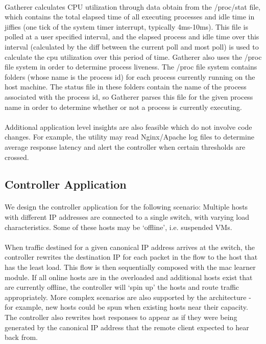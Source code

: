 \documentclass[10pt]{article}
\begin{document}
\paragraph{} Gatherer calculates CPU utilization through data obtain from the /proc/stat file, which contains the total elapsed time of all executing processes and idle time in jiffies (one tick of the system timer interrupt, typically 4ms-10ms). This file is polled at a user specified interval, and the elapsed process and idle time over this interval (calculated by the diff between the current poll and most poll) is used to calculate the cpu utilization over this period of time. Gatherer also uses the /proc file system in order to determine process liveness. The /proc file system contains folders (whose name is the process id) for each process currently running on the host machine. The status file in these folders contain the name of the process associated with the process id, so Gatherer parses this file for the given process name in order to determine whether or not a process is currently executing.

\paragraph{} Additional application level insights are also feasible which do not involve code changes. For example, the utility may read Nginx/Apache log files to determine average response latency and alert the controller when certain thresholds are crossed.

\subsection{Controller Application}

\paragraph{} We design the controller application for the following scenario: Multiple hosts with different IP addresses are connected to a single switch, with varying load characteristics. Some of these hosts may be ‘offline’, i.e. suspended VMs.

\paragraph{} When traffic destined for a given canonical IP address arrives at the switch, the controller rewrites the destination IP for each packet in the flow to the host that has the least load. This flow is then sequentially composed with the mac learner module. If all online hosts are in the overloaded and additional hosts exist that are currently offline, the controller will ‘spin up’ the hosts and route traffic appropriately. More complex scenarios are also supported by the architecture - for example, new hosts could be spun when existing hosts near their capacity. The controller also rewrites host responses to appear as if they were being generated by the canonical IP address that the remote client expected to hear back from.
\end{document}

